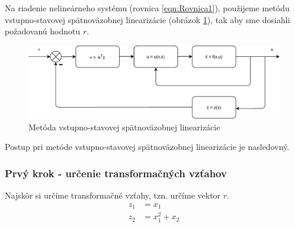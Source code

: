 \documentclass[../main.tex]{subfiles}
\begin{document}
Na riadenie nelineárneho systému (rovnica \ref{eqn:Rovnica1}), použijeme metódu vstupno-stavovej spätnoväzobnej linearizácie (obrázok \ref{fig:MetodaVS}), tak aby sme dosiahli požadovanú hodnotu $r$.
\begin{figure}[H]
	\begin{center}\includegraphics[scale=0.8]{MVSlin.pdf}\end{center}
	\caption{Metóda vstupno-stavovej spätnoväzobnej linearizácie}
	\label{fig:MetodaVS}
\end{figure}

Postup pri metóde vstupno-stavovej spätnoväzobnej linearizácie je nasledovný.

\subsubsection{Prvý krok - určenie transformačných vzťahov}
Najskôr si určíme transformačné vzťahy, tzn. určíme vektor $r$.
\begin{equation}
	\begin{aligned}
        z_1 &= x_1 \\
		z_2 &= x_1^2 + x_2 \\
	\end{aligned}
	\label{eqn:TransformacneVztahy}
\end{equation}
\end{document}

